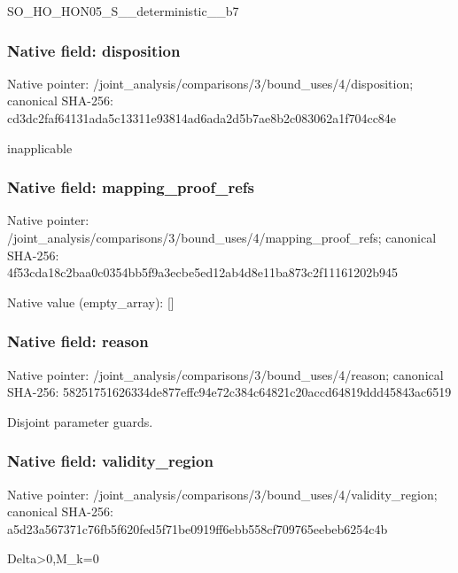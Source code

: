 \documentclass[10pt,a4paper]{article}
\begin{document}
\begingroup\raggedright\sloppy SO\_\allowbreak{}HO\_\allowbreak{}HON05\_\allowbreak{}S\_\allowbreak{}\_\allowbreak{}deterministic\_\allowbreak{}\_\allowbreak{}b7\par\endgroup

\subsubsection{Native field: disposition}
Native pointer: /joint\_\allowbreak{}analysis/comparisons/3/bound\_\allowbreak{}uses/4/disposition; canonical SHA-256: cd3dc2faf64131ada5c13311e93814ad6ada2d5b7ae8b2c083062a1f704cc84e

\begingroup\raggedright\sloppy inapplicable\par\endgroup

\subsubsection{Native field: mapping\_\allowbreak{}proof\_\allowbreak{}refs}
Native pointer: /joint\_\allowbreak{}analysis/comparisons/3/bound\_\allowbreak{}uses/4/mapping\_\allowbreak{}proof\_\allowbreak{}refs; canonical SHA-256: 4f53cda18c2baa0c0354bb5f9a3ecbe5ed12ab4d8e11ba873c2f11161202b945

Native value (empty\_\allowbreak{}array): []

\subsubsection{Native field: reason}
Native pointer: /joint\_\allowbreak{}analysis/comparisons/3/bound\_\allowbreak{}uses/4/reason; canonical SHA-256: 58251751626334de877effc94e72c384c64821c20accd64819ddd45843ac6519

\begingroup\raggedright\sloppy Disjoint parameter guards.\par\endgroup

\subsubsection{Native field: validity\_\allowbreak{}region}
Native pointer: /joint\_\allowbreak{}analysis/comparisons/3/bound\_\allowbreak{}uses/4/validity\_\allowbreak{}region; canonical SHA-256: a5d23a567371c76fb5f620fed5f71be0919ff6ebb558cf709765eebeb6254c4b

\begingroup\raggedright\sloppy Delta>0,\allowbreak{}M\_\allowbreak{}k=\allowbreak{}0\par\endgroup
\end{document}
